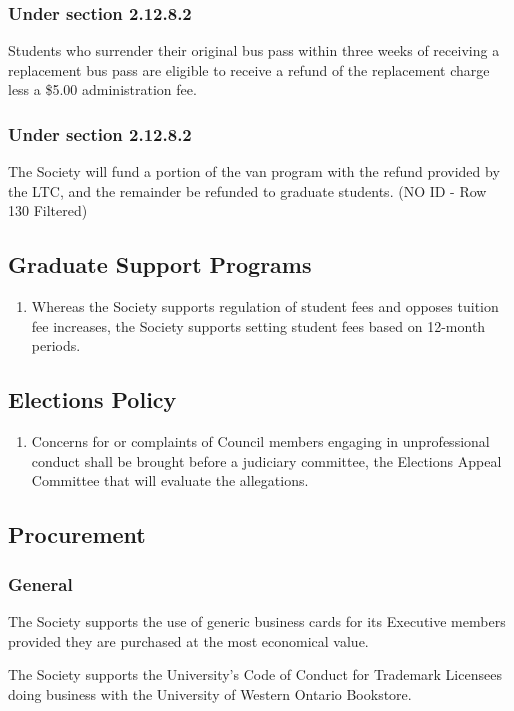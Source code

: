 \subsubsection{Under section 2.12.8.2}
\begin{longenum}[ label*=\thesubsubsection.\arabic*., align=left]
\item Students who surrender their original bus pass within three weeks of receiving a replacement bus pass are eligible to receive a refund of the replacement charge less a \$5.00 administration fee.  
\end{longenum}

\subsubsection{Under section 2.12.8.2}
\begin{longenum}[ label*=\thesubsubsection.\arabic*., align=left]
\item	The Society will fund a portion of the van program with the refund provided by the LTC, and the remainder be refunded to graduate students. (NO ID - Row 130 Filtered) \end{longenum} 

\subsection{Graduate Support Programs}
\begin{enumerate}
\item	Whereas the Society supports regulation of student fees and opposes tuition fee increases, the Society supports setting student fees based on 12-month periods. \end{enumerate}

\subsection{Elections Policy }
\begin{enumerate}
\item		Concerns for or complaints of Council members engaging in unprofessional conduct shall be brought before a judiciary committee, the Elections Appeal Committee that will evaluate the allegations. 
\end{enumerate}

\subsection{Procurement}
\subsubsection{General}
\begin{longenum}[ label*=\thesubsection.\arabic*., align=left]
\item	The Society supports the use of generic business cards for its Executive members provided they are purchased at the most economical value. 
\item	The Society supports the University's Code of Conduct for Trademark Licensees doing business with the University of Western Ontario Bookstore.     
\end{longenum}

